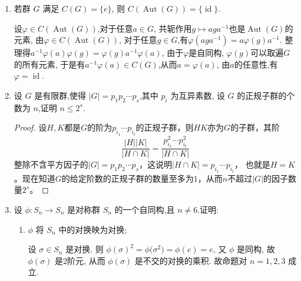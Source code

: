 \begin{enumerate}
\begin{enumerate}[label=(\arabic*)]
\begin{solution}
    一方面, 若 $G$ 是交换群,
    则 $f(xy)=(xy)^{-1}=y^{-1}x^{-1}=f(y)f(x)=f(x)f(y)$,
    故 $f$ 是群同态. 

    另一方面, 若 $f$ 是群同态, 则
    $$yx = \left( x^{-1}y^{-1} \right)^{-1} = f\left( x^{-1}y^{-1} \right) = f\left( x^{-1} \right) f\left( y^{-1} \right) = xy$$
    对任何 $x,y\in G$ 均成立, 从而 $G$ 是交换群. 
\end{solution}

\item 若 $G$ 是有限群且 $|\operatorname{Aut}(G)|=1$, 证明 $|G| \leqslant 2$.
\begin{solution}
    由 (1) 及 \textbf{习题1.5.4} 即得. 
\end{solution}

\end{enumerate}
\item 若群 $G$ 满足 $C(G)=\{e\}$, 则 $C(\operatorname{Aut}(G))=\{\operatorname{id}\}$.
\begin{solution}	
    设$\varphi \in C(\operatorname{Aut}(G))$,对于任意$a\in G$,
    共轭作用$g\mapsto aga^{-1}$也是$\operatorname{Aut}(G)$的元素,
    由$\varphi \in C(\operatorname{Aut}(G))$,
    对于任意$g\in G$,有$\varphi(aga^{-1})=a\varphi(g)a^{-1}$.
 	整理得$a^{-1}\varphi(a)\varphi(g)=\varphi(g)a^{-1}\varphi(a)$,
    由于$\varphi$是自同构, $\varphi(g)$可以取遍$G$的所有元素,
    于是有$a^{-1}\varphi(a) \in C (G)$,从而$a=\varphi(a)$,
    由$a$的任意性,有$\varphi=\operatorname{id}$.	
\end{solution}

\item 设 $G$ 是有限群,使得 $|G|=p_1 p_2 \cdots p_s$,其中 $p_i$ 为互异素数,
设 $G$ 的正规子群的个数为 $n$,证明 $n \leqslant 2^s$.
\begin{proof}
    设$H,K$都是$G$的阶为$p_{i_1} \cdots p_{i_t}$的正规子群，则$HK$亦为$G$的子群，其阶
    \[\frac{|H||K|}{|H \cap K|}=\frac{p_{i_1}^2 \cdots p_{i_t}^2}{|H \cap K|}\]
    整除不含平方因子的$|G|=p_1 p_2 \cdots p_s$，这说明$|H \cap K|=p_{i_1} \cdots p_{i_t}$，
    也就是$H=K$。现在知道$G$的给定阶数的正规子群的数量至多为$1$，从而$n$不超过$|G|$的因子数量$2^s$。
\end{proof}
\item 设 $\phi: S_n \rightarrow S_n$ 是对称群 $S_n$ 的一个自同构,且 $n \neq 6$.证明:
\begin{enumerate}[label=(\arabic*)]
\item $\phi$ 将 $S_n$ 中的对换映为对换;
\begin{solution}
    设 $\sigma\in S_n$ 是对换.
    则 $\phi(\sigma)^2=\phi\big(\sigma^2\big)=\phi(e)=e$,
    又 $\phi$ 是同构, 故 $\phi(\sigma)$ 是$2$阶元,
    从而 $\phi(\sigma)$ 是不交的对换的乘积.
    故命题对 $n=1,2,3$ 成立. 


\end{solution}
\end{enumerate}
\end{enumerate}
